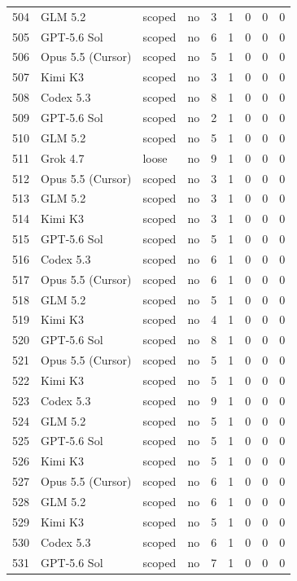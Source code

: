 \begin{tabular}{lllllllll}
504 & GLM 5.2 & scoped & no & 3 & 1 & 0 & 0 & 0 \\
505 & GPT-5.6 Sol & scoped & no & 6 & 1 & 0 & 0 & 0 \\
506 & Opus 5.5 (Cursor) & scoped & no & 5 & 1 & 0 & 0 & 0 \\
507 & Kimi K3 & scoped & no & 3 & 1 & 0 & 0 & 0 \\
508 & Codex 5.3 & scoped & no & 8 & 1 & 0 & 0 & 0 \\
509 & GPT-5.6 Sol & scoped & no & 2 & 1 & 0 & 0 & 0 \\
510 & GLM 5.2 & scoped & no & 5 & 1 & 0 & 0 & 0 \\
511 & Grok 4.7 & loose & no & 9 & 1 & 0 & 0 & 0 \\
512 & Opus 5.5 (Cursor) & scoped & no & 3 & 1 & 0 & 0 & 0 \\
513 & GLM 5.2 & scoped & no & 3 & 1 & 0 & 0 & 0 \\
514 & Kimi K3 & scoped & no & 3 & 1 & 0 & 0 & 0 \\
515 & GPT-5.6 Sol & scoped & no & 5 & 1 & 0 & 0 & 0 \\
516 & Codex 5.3 & scoped & no & 6 & 1 & 0 & 0 & 0 \\
517 & Opus 5.5 (Cursor) & scoped & no & 6 & 1 & 0 & 0 & 0 \\
518 & GLM 5.2 & scoped & no & 5 & 1 & 0 & 0 & 0 \\
519 & Kimi K3 & scoped & no & 4 & 1 & 0 & 0 & 0 \\
520 & GPT-5.6 Sol & scoped & no & 8 & 1 & 0 & 0 & 0 \\
521 & Opus 5.5 (Cursor) & scoped & no & 5 & 1 & 0 & 0 & 0 \\
522 & Kimi K3 & scoped & no & 5 & 1 & 0 & 0 & 0 \\
523 & Codex 5.3 & scoped & no & 9 & 1 & 0 & 0 & 0 \\
524 & GLM 5.2 & scoped & no & 5 & 1 & 0 & 0 & 0 \\
525 & GPT-5.6 Sol & scoped & no & 5 & 1 & 0 & 0 & 0 \\
526 & Kimi K3 & scoped & no & 5 & 1 & 0 & 0 & 0 \\
527 & Opus 5.5 (Cursor) & scoped & no & 6 & 1 & 0 & 0 & 0 \\
528 & GLM 5.2 & scoped & no & 6 & 1 & 0 & 0 & 0 \\
529 & Kimi K3 & scoped & no & 5 & 1 & 0 & 0 & 0 \\
530 & Codex 5.3 & scoped & no & 6 & 1 & 0 & 0 & 0 \\
531 & GPT-5.6 Sol & scoped & no & 7 & 1 & 0 & 0 & 0 \\

\end{tabular}
